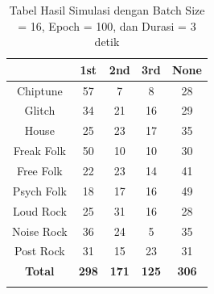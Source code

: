 \begin{longtable}[c]{|c|c|c|c|c|}
	\hline
	\textbf{}      & \textbf{1st} & \textbf{2nd} & \textbf{3rd} & \textbf{None} \\ \hline
	\endfirsthead
	\endhead
	Chiptune       & 57           & 7            & 8            & 28            \\ \hline
	Glitch         & 34           & 21           & 16           & 29            \\ \hline
	House          & 25           & 23           & 17           & 35            \\ \hline
	Freak Folk     & 50           & 10           & 10           & 30            \\ \hline
	Free Folk      & 22           & 23           & 14           & 41            \\ \hline
	Psych Folk     & 18           & 17           & 16           & 49            \\ \hline
	Loud Rock      & 25           & 31           & 16           & 28            \\ \hline
	Noise Rock     & 36           & 24           & 5            & 35            \\ \hline
	Post Rock      & 31           & 15           & 23           & 31            \\ \hline
	\textbf{Total} & \textbf{298} & \textbf{171} & \textbf{125} & \textbf{306}  \\ \hline
	\caption{Tabel Hasil Simulasi dengan Batch Size = 16, Epoch = 100, dan Durasi = 3 detik}
	\label{tab:my-table}\\
\end{longtable}

